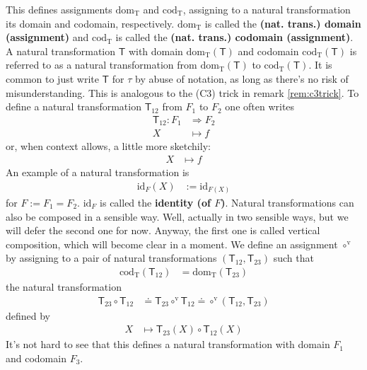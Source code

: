 This defines assignments $\mathrm{dom_{T}}$ and $\mathrm{cod_{T}}$, assigning to a natural transformation its domain and codomain, respectively.
$\mathrm{dom_{T}}$ is called the \textbf{(nat. trans.) domain (assignment)} and $\mathrm{cod_{T}}$ is called the \textbf{(nat. trans.) codomain (assignment)}.
A natural transformation $\mathsf{T}$ with domain $\mathrm{dom_{T}}(\mathsf{T})$ and codomain $\mathrm{cod_{T}}(\mathsf{T})$ is referred to as a natural transformation from $\mathrm{dom_{T}}(\mathsf{T})$ to $\mathrm{cod_{T}}(\mathsf{T})$.
It is common to just write $\mathsf{T}$ for $\tau$ by abuse of notation, as long as there's no risk of misunderstanding.
This is analogous to the (C3) trick in remark \ref{rem:c3trick}.
To define a natural transformation $\mathsf{T}_{12}$ from $F_{1}$ to $F_{2}$ one often writes
\begin{align*}
  \mathsf{T}_{12}
  \colon
  F_{1}
  &\Rightarrow
  F_{2}
  \\
  X
  &\mapsto
  f
\end{align*}
or, when context allows, a little more sketchily:
\begin{align*}
  X
  &\mapsto
  f
\end{align*}
An example of a natural transformation is
\begin{align*}
  \mathrm{id}_{F}(X)
  &:=
  \mathrm{id}_{F(X)}
\end{align*}
for $F := F_{1} = F_{2}$.
$\mathrm{id}_{F}$ is called the \textbf{identity (of $F$)}.
Natural transformations can also be composed in a sensible way.
Well, actually in two sensible ways, but we will defer the second one for now.
Anyway, the first one is called vertical composition, which will become clear in a moment.
We define an assignment $\circ^{\textrm{v}}$ by assigning to a pair of natural transformations $(\mathsf{T}_{12},\mathsf{T}_{23})$ such that
\begin{align*}
  \mathrm{cod_{T}}(\mathsf{T}_{12})
  &=
  \mathrm{dom_{T}}(\mathsf{T}_{23})
\end{align*}
the natural transformation
\begin{align*}
  \mathsf{T}_{23}
  \circ
  \mathsf{T}_{12}
  &\doteq
  \mathsf{T}_{23}
  \circ^{\textrm{v}}
  \mathsf{T}_{12}
  \doteq
  \circ^{\textrm{v}}(\mathsf{T}_{12},\mathsf{T}_{23})
\end{align*}
defined by
\begin{align*}
  X
  &\mapsto
  \mathsf{T}_{23}(X)
  \circ
  \mathsf{T}_{12}(X)
\end{align*}
It's not hard to see that this defines a natural transformation with domain $F_{1}$ and codomain $F_{3}$.

